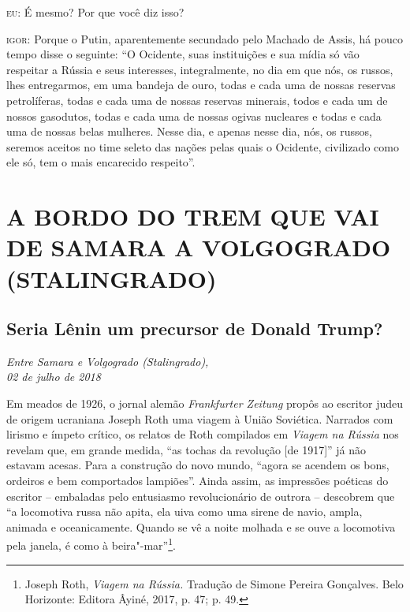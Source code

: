 \textsc{eu:} É mesmo? Por que você diz isso?

\textsc{igor:} Porque o Putin, aparentemente secundado pelo Machado de
Assis, há pouco tempo disse o seguinte: ``O Ocidente, suas instituições
e sua mídia só vão respeitar a Rússia e seus interesses, integralmente,
no dia em que nós, os russos, lhes entregarmos, em uma bandeja de ouro,
todas e cada uma de nossas reservas petrolíferas, todas e cada uma de
nossas reservas minerais, todos e cada um de nossos gasodutos, todas e
cada uma de nossas ogivas nucleares e todas e cada uma de nossas belas
mulheres. Nesse dia, e apenas nesse dia, nós, os russos, seremos aceitos
no time seleto das nações pelas quais o Ocidente, civilizado como ele
só, tem o mais encarecido respeito''.

\clearpage{\pagestyle{empty}\cleardoublepage}
\movetooddpage
{}
\part*{A BORDO DO TREM QUE VAI DE SAMARA A VOLGOGRADO (STALINGRADO)}

\chapter*{Seria Lênin um precursor de Donald Trump?}

\begin{flushright}
\emph{Entre Samara e Volgogrado (Stalingrado),\\02 de julho de 2018}
\end{flushright}

Em meados de 1926, o jornal alemão \emph{Frankfurter Zeitung} propôs ao
escritor judeu de origem ucraniana Joseph Roth uma viagem à União
Soviética. Narrados com lirismo e ímpeto crítico, os relatos de Roth
compilados em \emph{Viagem na Rússia} nos revelam que, em grande medida,
``as tochas da revolução {[}de 1917{]}'' já não estavam acesas. Para a
construção do novo mundo, ``agora se acendem os bons, ordeiros e bem
comportados lampiões''. Ainda assim, as impressões poéticas do escritor
-- embaladas pelo entusiasmo revolucionário de outrora -- descobrem que
``a locomotiva russa não apita, ela uiva como uma sirene de navio,
ampla, animada e oceanicamente. Quando se vê a noite molhada e se ouve a
locomotiva pela janela, é como à beira"-mar''\footnote{Joseph Roth,
  \emph{Viagem na Rússia.} Tradução de Simone Pereira Gonçalves. Belo
  Horizonte: Editora Âyiné, 2017, p. 47; p. 49.}.

